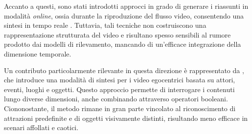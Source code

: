Accanto a questi, sono stati introdotti approcci in grado di generare i riassunti in modalità \emph{online}, ossia durante la riproduzione del flusso video, consentendo una sintesi in tempo reale \cite{Lin_2015_ICCV_Workshops,Zhao_2014_CVPR}. Tuttavia, tali tecniche non costruiscono una rappresentazione strutturata del video e risultano spesso sensibili al rumore prodotto dai modelli di rilevamento, mancando di un'efficace integrazione della dimensione temporale.

Un contributo particolarmente rilevante in questa direzione è rappresentato da \cite{Xiong_2015_ICCV}, che introduce una modalità di sintesi per i video egocentrici basata su attori, eventi, luoghi e oggetti. Questo approccio permette di interrogare i contenuti lungo diverse dimensioni, anche combinando attraverso operatori booleani. Ciononostante, il metodo rimane in gran parte vincolato al riconoscimento di attrazioni predefinite e di oggetti visivamente distinti, risultando meno efficace in scenari affollati e caotici.